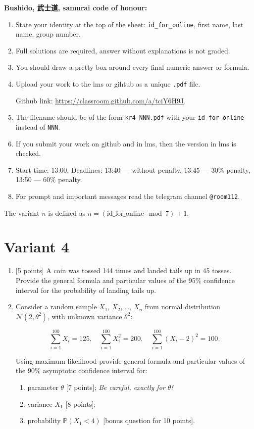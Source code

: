 \documentclass[12pt]{article}
\def \cN{\mathcal{N}}
\def \P{\mathbb{P}}
\newcommand \id {\mathrm{id}\_\mathrm{for}\_\mathrm{online}}
\begin{document}
\textbf{Bushido, 武士道, samurai code of honour:}

\vspace{5mm}

\begin{enumerate}
\item State your identity at the top of the sheet: \verb|id_for_online|, first name, last name, group number.
\item Full solutions are required, answer without explanations is not graded. 
\item You should draw a pretty box around every final numeric answer or formula.
\item Upload your work to the lms or gihtub as a unique \verb|.pdf| file.

Github link: \url{https://classroom.github.com/a/tciY6H9J}.
\item The filename should be of the form \verb|kr4_NNN.pdf| with your \verb|id_for_online| instead of \verb|NNN|.
\item If you submit your work on github and in lms, then the version in lms is checked.
\item Start time: 13:00. Deadlines: 13:40 — without penalty, 13:45 — 30\% penalty, 13:50 — 60\% penalty.
\item For prompt and important messages read the telegram channel \verb|@room112|.
\end{enumerate}


\newpage

The variant $n$ is defined as $n=(\id \mod 7)+1$. 


\section*{Variant 4}
\begin{enumerate}

\item {[5 points]} A coin was tossed 144 times and landed tails up in 45 tosses.
Provide the general formula and particular values
of the 95\% confidence interval for the probability of landing tails up.

\item Consider a random sample $X_1$, $X_2$, \ldots, $X_n$ from normal distribution $\cN(2, \theta^2)$, 
with unknown variance $\theta^2$:

\[
\sum_{i=1}^{100} X_i = 125, \quad \sum_{i=1}^{100} X_i^2 = 200, \quad \sum_{i=1}^{100} (X_i - 2)^2 = 100.  
\]

Using maximum likelihood 
provide general formula and particular values
of the 90\% asymptotic confidence interval for:

\begin{enumerate}
  \item parameter $\theta$ {[7 points]}; \textit{Be careful, exactly for $\theta$!}
  \item variance $X_1$ {[8 points]};
  \item probability $\P(X_1 < 4)$ {[bonus question for 10 points]}.
\end{enumerate}

\end{enumerate}
\end{document}
